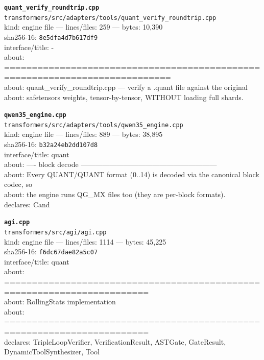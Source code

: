 \noindent\textbf{\texttt{quant\_verify\_roundtrip.cpp}}\\
\texttt{transformers/src/adapters/tools/quant\_verify\_roundtrip.cpp}\\
kind: engine file --- lines/files: 259 --- bytes: 10,390\\
sha256-16: \texttt{8e5dfa4d7b617df9}\\
interface/title: -\\
about: ============================================================================\\
about: quant\_verify\_roundtrip.cpp — verify a .quant file against the original\\
about: safetensors weights, tensor-by-tensor, WITHOUT loading full shards.\\
\vspace*{6.0pt}

\noindent\textbf{\texttt{qwen35\_engine.cpp}}\\
\texttt{transformers/src/adapters/tools/qwen35\_engine.cpp}\\
kind: engine file --- lines/files: 889 --- bytes: 38,895\\
sha256-16: \texttt{b32a24eb2dd107d8}\\
interface/title: quant\\
about: ---- block decode ---------------------------------------------------------\\
about: Every QUANT/QUANT format (0..14) is decoded via the canonical block codec, so\\
about: the engine runs QG\_MX files too (they are per-block formats).\\
declares: Cand\\
\vspace*{6.0pt}

\noindent\textbf{\texttt{agi.cpp}}\\
\texttt{transformers/src/agi/agi.cpp}\\
kind: engine file --- lines/files: 1114 --- bytes: 45,225\\
sha256-16: \texttt{f6dc67dae82a5c07}\\
interface/title: quant\\
about: ========================================================================\\
about: RollingStats implementation\\
about: ========================================================================\\
declares: TripleLoopVerifier, VerificationResult, ASTGate, GateResult, DynamicToolSynthesizer, Tool\\
\vspace*{6.0pt}
\newpage

